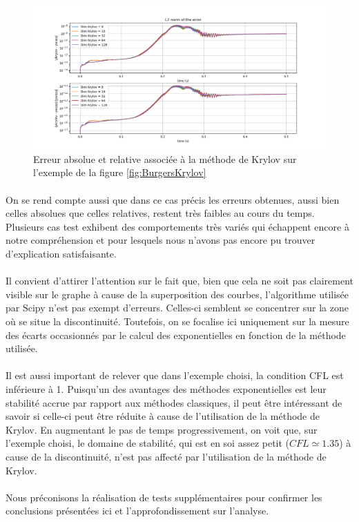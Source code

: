         \begin{figure}[h!]
            \centering
            \includegraphics[width=\textwidth]{images/erreur_krylov.png}
            \caption{Erreur absolue et relative associée à la méthode de Krylov sur l'exemple de la figure \ref{fig:BurgersKrylov}}
            \label{fig:Krylov}
        \end{figure}

        \paragraph{}
        On se rend compte aussi que dans ce cas précis les erreurs obtenues, aussi bien celles absolues que celles relatives, restent très faibles au cours du temps. Plusieurs cas test exhibent des comportements très variés qui échappent encore à notre compréhension et pour lesquels nous n'avons pas encore pu trouver d'explication satisfaisante.

        \paragraph{}
        Il convient d'attirer l'attention sur le fait que, bien que cela ne soit pas clairement visible sur le graphe à cause de la superposition des courbes, l'algorithme utilisée par Scipy n'est pas exempt d'erreurs. Celles-ci semblent se concentrer sur la zone où se situe la discontinuité. Toutefois, on se focalise ici uniquement sur la mesure des écarts occasionnés par le calcul des exponentielles en fonction de la méthode utilisée. 

        \paragraph{}
        Il est aussi important de relever que dans l'exemple choisi, la condition CFL est inférieure à 1. Puisqu'un des avantages des méthodes exponentielles est leur stabilité accrue par rapport aux méthodes classiques, il peut être intéressant de savoir si  celle-ci peut être réduite à cause de l'utilisation de la méthode de Krylov. En augmentant le pas de temps progressivement, on voit que, sur l'exemple choisi, le domaine de stabilité, qui est en soi assez petit ($CFL \simeq 1.35$) à cause de la discontinuité, n'est pas affecté par l'utilisation de la méthode de Krylov.

        \paragraph{}
        Nous préconisons la réalisation de tests supplémentaires pour confirmer les conclusions présentées ici et l'approfondissement sur l'analyse.

